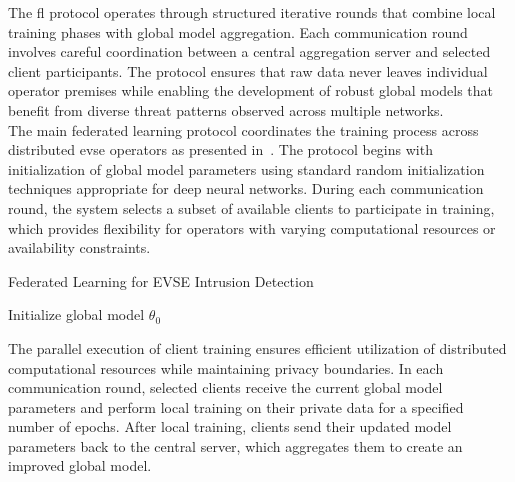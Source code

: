 The \gls{fl} protocol operates through structured iterative rounds that combine local training phases with global model aggregation. Each communication round involves careful coordination between a central aggregation server and selected client participants. The protocol ensures that raw data never leaves individual operator premises while enabling the development of robust global models that benefit from diverse threat patterns observed across multiple networks. \\

The main federated learning protocol coordinates the training process across distributed \gls{evse} operators as presented in~. The protocol begins with initialization of global model parameters using standard random initialization techniques appropriate for deep neural networks. During each communication round, the system selects a subset of available clients to participate in training, which provides flexibility for operators with varying computational resources or availability constraints. \\

\begin{algorithm}[H]
	\caption{Federated Learning for EVSE Intrusion Detection~\vspace{0.25em}}
	\label{algorithm:federated-learning}
	\vspace*{3.5pt}
	{
		\IncMargin{1em} %
		Initialize global model $\theta_0$\;
		\;
	}
\end{algorithm}
\medskip

The parallel execution of client training ensures efficient utilization of distributed computational resources while maintaining privacy boundaries. In each communication round, selected clients receive the current global model parameters and perform local training on their private data for a specified number of epochs. After local training, clients send their updated model parameters back to the central server, which aggregates them to create an improved global model. \\

